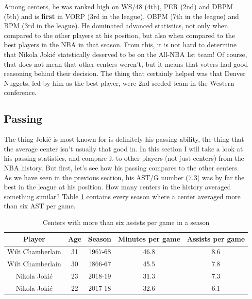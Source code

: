 \documentclass[a4paper]{article}
\begin{document}
Among centers, he was ranked high on WS/48 (4th), PER (2nd) and DBPM (5th) and is \textbf{first} in VORP (3rd in the league), OBPM (7th in the league) and BPM (3rd in the league). He dominated advanced statistics, not only when compared to the other players at his position, but also when compared to the best players in the NBA in that season. From this, it is not hard to determine that Nikola Joki\' c statstically deserved to be on the All-NBA 1st team! Of course, that does not mean that other centers weren't, but it means that voters had good reasoning behind their decision. The thing that certainly helped was that Denver Nuggets, led by him as the best player, were 2nd seeded team in the Western conference.

\subsection{Passing}
\label{subsec:jokic_passing}

The thing Joki\' c is most known for is definitely his passing ability, the thing that the average center isn't usually that good in. In this section I will take a look at his passing statistics, and compare it to other players (not just centers) from the NBA history. But first, let's see how his passing compares to the other centers. As we have seen in the previous section, his AST/G number (7.3) was by far the best in the league at his position. How many centers in the history averaged something similar? Table \ref{tab:centers_ast_g} contains every season where a center averaged more than six AST per game.

\begin{table}[h!]
\begin{center}
\begin{tabular}{|c|c|c|c|c|} \hline
\textbf{Player} & \textbf{Age} & \textbf{Season} & \textbf{Minutes per game} & \textbf{Assists per game} \\ \hline
Wilt Chamberlain & 31 & 1967-68 & 46.8 & 8.6 \\ \hline
Wilt Chamberlain & 30 & 1866-67 & 45.5 & 7.8\\ \hline
Nikola Jokić & 23 & 2018-19 & 31.3 & 7.3 \\ \hline
Nikola Jokić & 22 & 2017-18 & 32.6 & 6.1 \\ \hline
\end{tabular}
\caption{Centers with more than six assists per game in a season}
\label{tab:centers_ast_g}
\end{center}
\end{table}
\end{document}
